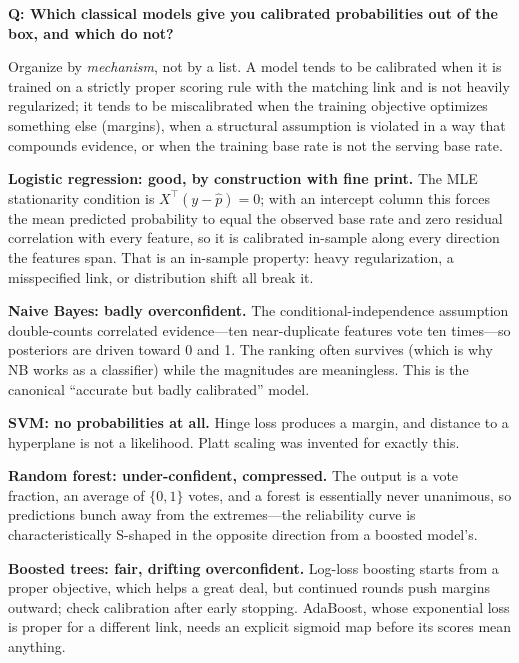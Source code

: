 \begin{interviewq}
\textbf{Q: Which classical models give you calibrated probabilities out of the box, and which do not?}

 \quad {} \quad \badgefreq{\freqmed}

\stronganswer

Organize by \textit{mechanism}, not by a list. A model tends to be calibrated when it is trained on a strictly proper scoring rule with the matching link and is not heavily regularized; it tends to be miscalibrated when the training objective optimizes something else (margins), when a structural assumption is violated in a way that compounds evidence, or when the training base rate is not the serving base rate.

\textbf{Logistic regression: good, by construction with fine print.} The MLE stationarity condition is $X^\top(y - \hat p) = 0$; with an intercept column this forces the mean predicted probability to equal the observed base rate and zero residual correlation with every feature, so it is calibrated in-sample along every direction the features span. That is an in-sample property: heavy regularization, a misspecified link, or distribution shift all break it.

\textbf{Naive Bayes: badly overconfident.} The conditional-independence assumption double-counts correlated evidence---ten near-duplicate features vote ten times---so posteriors are driven toward 0 and 1. The ranking often survives (which is why NB works as a classifier) while the magnitudes are meaningless. This is the canonical ``accurate but badly calibrated'' model.

\textbf{SVM: no probabilities at all.} Hinge loss produces a margin, and distance to a hyperplane is not a likelihood. Platt scaling was invented for exactly this.

\textbf{Random forest: under-confident, compressed.} The output is a vote fraction, an average of $\{0,1\}$ votes, and a forest is essentially never unanimous, so predictions bunch away from the extremes---the reliability curve is characteristically S-shaped in the opposite direction from a boosted model's.

\textbf{Boosted trees: fair, drifting overconfident.} Log-loss boosting starts from a proper objective, which helps a great deal, but continued rounds push margins outward; check calibration after early stopping. AdaBoost, whose exponential loss is proper for a different link, needs an explicit sigmoid map before its scores mean anything.


\end{interviewq}
